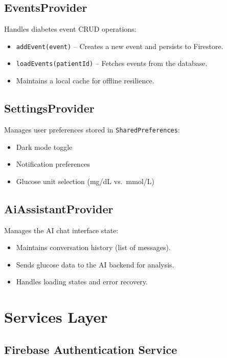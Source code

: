 \documentclass[12pt,a4paper]{article}
\begin{document}
\subsection{EventsProvider}

Handles diabetes event CRUD operations:
\begin{itemize}
    \item \texttt{addEvent(event)} -- Creates a new event and persists to Firestore.
    \item \texttt{loadEvents(patientId)} -- Fetches events from the database.
    \item Maintains a local cache for offline resilience.
\end{itemize}

\subsection{SettingsProvider}

Manages user preferences stored in \texttt{SharedPreferences}:
\begin{itemize}
    \item Dark mode toggle
    \item Notification preferences
    \item Glucose unit selection (mg/dL vs.\ mmol/L)
\end{itemize}

\subsection{AiAssistantProvider}

Manages the AI chat interface state:
\begin{itemize}
    \item Maintains conversation history (list of messages).
    \item Sends glucose data to the AI backend for analysis.
    \item Handles loading states and error recovery.
\end{itemize}

\section{Services Layer}

\subsection{Firebase Authentication Service}
\end{document}
